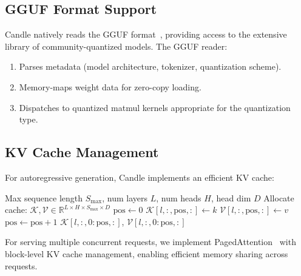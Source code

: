 \subsection{GGUF Format Support}

Candle natively reads the GGUF format~\cite{ggml2023}, providing access to the extensive library of community-quantized models. The GGUF reader:

\begin{enumerate}[leftmargin=1.4em]
    \item Parses metadata (model architecture, tokenizer, quantization scheme).
    \item Memory-maps weight data for zero-copy loading.
    \item Dispatches to quantized matmul kernels appropriate for the quantization type.
\end{enumerate}

\subsection{KV Cache Management}

For autoregressive generation, Candle implements an efficient KV cache:

\begin{algorithm}[H]
\caption{Paged KV Cache}
\label{alg:kvcache}
\begin{algorithmic}[1]
\Require Max sequence length $S_{\max}$, num layers $L$, num heads $H$, head dim $D$
\State Allocate cache: $\mathcal{K}, \mathcal{V} \in \mathbb{R}^{L \times H \times S_{\max} \times D}$
\State $\text{pos} \gets 0$
    \State $\mathcal{K}[l, :, \text{pos}, :] \gets k$
    \State $\mathcal{V}[l, :, \text{pos}, :] \gets v$
    \State $\text{pos} \gets \text{pos} + 1$
\EndFunction
{}
    \State \Return $\mathcal{K}[l, :, 0:\text{pos}, :]$, $\mathcal{V}[l, :, 0:\text{pos}, :]$
\EndFunction
\end{algorithmic}
\end{algorithm}

For serving multiple concurrent requests, we implement PagedAttention~\cite{kwon2023vllm} with block-level KV cache management, enabling efficient memory sharing across requests.

